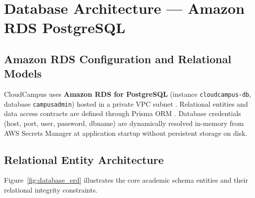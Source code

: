 \newpage
\section{Database Architecture --- Amazon RDS PostgreSQL}

\subsection{Amazon RDS Configuration and Relational Models}
CloudCampus uses \textbf{Amazon RDS for PostgreSQL} (instance \texttt{cloudcampus-db}, database \texttt{campusadmin}) hosted in a private VPC subnet \cite{aws_rds}. Relational entities and data access contracts are defined through Prisma ORM \cite{prisma_orm}. Database credentials (host, port, user, password, dbname) are dynamically resolved in-memory from AWS Secrets Manager at application startup without persistent storage on disk.

\subsection{Relational Entity Architecture}
Figure~\ref{fig:database_erd} illustrates the core academic schema entities and their relational integrity constraints.

